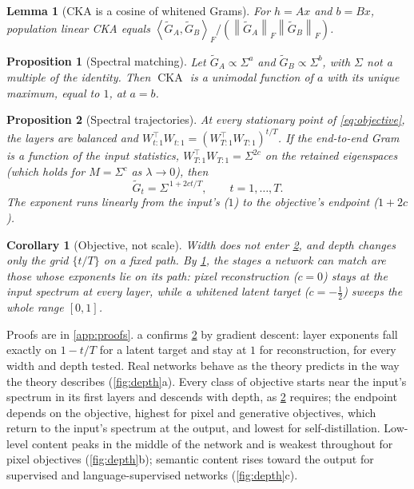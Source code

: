 \documentclass[10pt]{article}
\theoremstyle{plain}
\newtheorem{proposition}{Proposition}
\newtheorem{corollary}{Corollary}
\newtheorem{lemma}{Lemma}
\theoremstyle{definition}
\theoremstyle{remark}
\newcommand{\T}{\top}
\newcommand{\fro}[1]{\left\lVert #1 \right\rVert_F}
\newcommand{\ip}[2]{\left\langle #1, #2 \right\rangle_F}
\newcommand{\CKA}{\operatorname{CKA}}
\begin{document}
\begin{lemma}[CKA is a cosine of whitened Grams]
\label{lem:cka}
For $h = Ax$ and $b = Bx$, population linear CKA equals
$\ip{\tilde G_A}{\tilde G_B}/(\fro{\tilde G_A}\fro{\tilde G_B})$.
\end{lemma}

\begin{proposition}[Spectral matching]
\label{prop:match}
Let $\tilde G_A \propto \Sigma^a$ and $\tilde G_B \propto \Sigma^b$, with $\Sigma$ not a
multiple of the identity. Then $\CKA$ is a unimodal function of $a$ with its unique maximum,
equal to $1$, at $a = b$.
\end{proposition}

\begin{proposition}[Spectral trajectories]
\label{prop:traj}
At every stationary point of \eqref{eq:objective}, the layers are balanced and
$W_{t:1}^\T W_{t:1} = (W_{T:1}^\T W_{T:1})^{t/T}$. If the end-to-end Gram is a function of the
input statistics, $W_{T:1}^\T W_{T:1} = \Sigma^{2c}$ on the retained eigenspaces (which holds
for $M = \Sigma^c$ as $\lambda\to0$), then
\begin{equation}
  \tilde G_t = \Sigma^{\,1 + 2ct/T}, \qquad t = 1,\dots,T .
\end{equation}
The exponent runs linearly from the input's ($1$) to the objective's endpoint ($1 + 2c$).
\end{proposition}

\begin{corollary}[Objective, not scale]
\label{cor:scale}
Width does not enter \cref{prop:traj}, and depth changes only the grid $\{t/T\}$ on a fixed
path. By \cref{prop:match}, the stages a network can match are those whose exponents lie on its
path: pixel reconstruction ($c=0$) stays at the input spectrum at every layer, while a whitened
latent target ($c=-\tfrac12$) sweeps the whole range $[0,1]$.
\end{corollary}

\noindent
Proofs are in \cref{app:proofs}. a confirms \cref{prop:traj} by gradient
descent: layer exponents fall exactly on $1-t/T$ for a latent target and stay at $1$ for
reconstruction, for every width and depth tested. Real networks behave as the theory predicts
in the way the theory describes (\cref{fig:depth}a). Every class of objective starts near the
input's spectrum in its first layers and descends with depth, as \cref{prop:traj} requires; the
endpoint depends on the objective, highest for pixel and generative objectives, which return to
the input's spectrum at the output, and lowest for self-distillation. Low-level content peaks in
the middle of the network and is weakest throughout for pixel objectives
(\cref{fig:depth}b); semantic content rises toward the output for supervised and
language-supervised networks (\cref{fig:depth}c).
\end{document}
